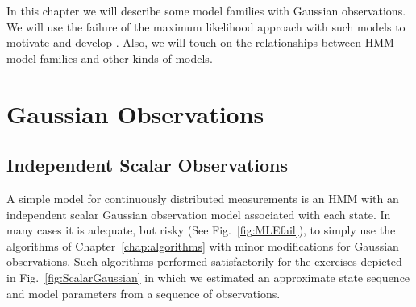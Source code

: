 In this chapter we will describe some model families with Gaussian
observations.  We will use the failure of the maximum likelihood
approach with such models to motivate and develop
\emph{}.  Also, we will touch on the
relationships between HMM model families and other kinds of models.

\section{Gaussian Observations}
\label{sec:gaussian}

\subsection{Independent Scalar Observations}
\label{sec:ScalarGaussian}

A simple model for continuously distributed measurements is an HMM
with an independent scalar Gaussian observation model associated with each
state.  In many cases it is adequate, but risky (See
Fig.~\ref{fig:MLEfail}), to simply use the algorithms of
Chapter~\ref{chap:algorithms} with minor modifications for Gaussian
observations.  Such algorithms performed satisfactorily for the exercises
depicted in Fig.~\ref{fig:ScalarGaussian} in which we estimated an
approximate state sequence and model parameters from a sequence of
observations.

